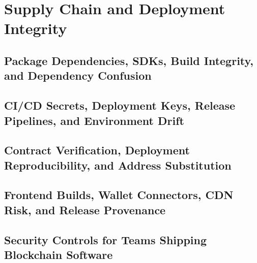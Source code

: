 \chapter{Supply Chain and Deployment Integrity}

\section{Package Dependencies, SDKs, Build Integrity, and Dependency Confusion}

\section{CI/CD Secrets, Deployment Keys, Release Pipelines, and Environment Drift}

\section{Contract Verification, Deployment Reproducibility, and Address Substitution}

\section{Frontend Builds, Wallet Connectors, CDN Risk, and Release Provenance}

\section{Security Controls for Teams Shipping Blockchain Software}
